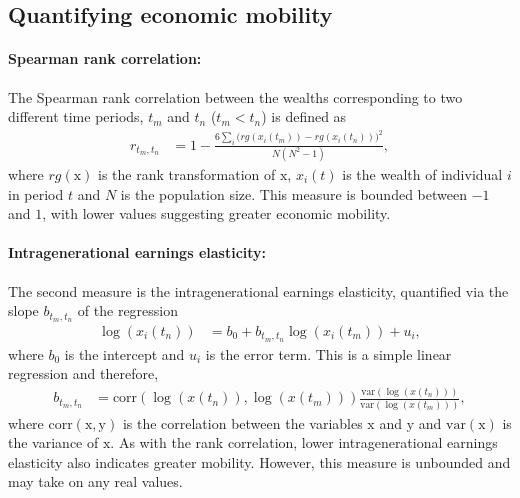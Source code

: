 \documentclass[11pt]{article}
\numberwithin{equation}{section}
\begin{document}
\subsection{Quantifying economic mobility}


 

\paragraph{Spearman rank correlation:} The Spearman rank correlation between the wealths corresponding to two different time periods, $t_m$ and $t_n$ ($t_m < t_n$) is defined as
\begin{align*}
    r_{t_m,t_n} &= 1 - \frac{6\sum_i \big(rg(x_i(t_m)) - rg(x_i(t_n))\big)^2}{N(N^2-1)},
\end{align*}
where $rg(\mathrm{x})$ is the rank transformation of $\mathrm{x}$, $x_i(t)$ is the wealth of individual $i$ in period $t$ and $N$ is the population size. This measure is bounded between $-1$ and $1$, with lower values suggesting greater economic mobility.

\paragraph{Intragenerational earnings elasticity:} The second measure is the intragenerational earnings elasticity, quantified via the slope $b_{t_m,t_n}$ of the regression
\begin{align*}
   \log( x_i(t_n)) &= b_0 + b_{t_m,t_n} \log(x_i(t_m)) + u_i,
\end{align*}
where $b_0$ is the intercept and $u_i$ is the error term. This is a simple linear regression and therefore,
\begin{align}
    b_{t_m,t_n} &= \mathrm{corr}(\log(x(t_n)),\log(x(t_m))) \frac{\mathrm{var}(\log(x(t_n)))}{\mathrm{var}(\log(x(t_m)))},
    \label{eq:iee-estimation}
\end{align}
where $\mathrm{corr}(\mathrm{x},\mathrm{y})$ is the correlation between the variables $\mathrm{x}$ and $\mathrm{y}$ and $\mathrm{var}(\mathrm{x})$ is the variance of $\mathrm{x}$. As with the rank correlation, lower intragenerational earnings elasticity also indicates greater mobility. However, this measure is unbounded and may take on any real values.
\end{document}
